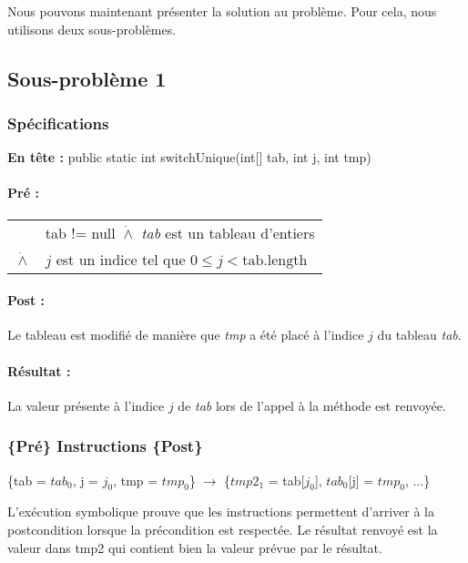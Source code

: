 Nous pouvons maintenant présenter la solution au problème. Pour cela, nous utilisons deux sous-problèmes. 
\subsection{Sous-problème 1}

\subsubsection*{Spécifications}
\noindent \textbf{En tête :} public static int switchUnique(int[] tab, int j, int tmp) \\
\paragraph{Pré :}

\begin{tabular}{ll}
  & tab != null  $\dot{\wedge}$ \textit{tab} est un tableau d'entiers \\
  $\dot{\wedge}$ & $j$ est un indice tel que $0 \le j < \mathrm{tab.length}$
\end{tabular}

\paragraph{Post :}

Le tableau est modifié de manière que \textit{tmp} a été placé à l'indice $j$ du tableau \textit{tab}.

\paragraph{Résultat :}

La valeur présente à l'indice $j$ de \textit{tab} lors de l'appel à la méthode est renvoyée.

\subsubsection*{ \{Pré\} Instructions \{Post\} }

\{tab = $tab_{0}$, j = $j_{0}$, tmp = $tmp_{0}$\} $\rightarrow$ \{$tmp2_{1}$ = tab[$j_{0}$], $tab_{0}$[j] = $tmp_{0}$, ...\}

L'exécution symbolique prouve que les instructions permettent d'arriver à la postcondition lorsque la précondition est respectée. Le résultat renvoyé est la valeur dans tmp2 qui contient bien la valeur prévue par le résultat.

